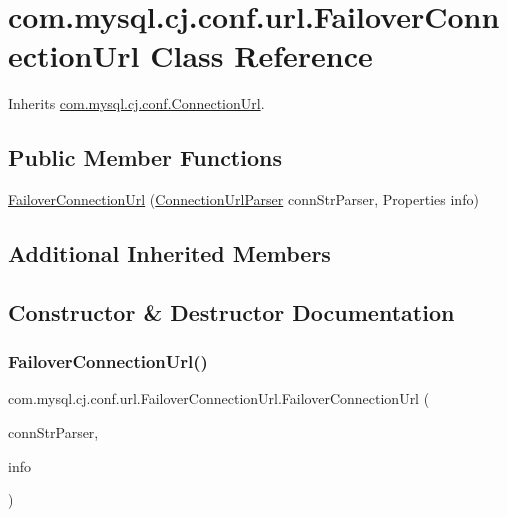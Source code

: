 \hypertarget{classcom_1_1mysql_1_1cj_1_1conf_1_1url_1_1_failover_connection_url}{}\section{com.\+mysql.\+cj.\+conf.\+url.\+Failover\+Connection\+Url Class Reference}
\label{classcom_1_1mysql_1_1cj_1_1conf_1_1url_1_1_failover_connection_url}


Inherits \mbox{\hyperlink{classcom_1_1mysql_1_1cj_1_1conf_1_1_connection_url}{com.\+mysql.\+cj.\+conf.\+Connection\+Url}}.

\subsection*{Public Member Functions}
\begin{DoxyCompactItemize}
\item 
\mbox{\hyperlink{classcom_1_1mysql_1_1cj_1_1conf_1_1url_1_1_failover_connection_url_a333794b536f65b34f5dd6f0f24683daa}{Failover\+Connection\+Url}} (\mbox{\hyperlink{classcom_1_1mysql_1_1cj_1_1conf_1_1_connection_url_parser}{Connection\+Url\+Parser}} conn\+Str\+Parser, Properties info)
\end{DoxyCompactItemize}
\subsection*{Additional Inherited Members}


\subsection{Constructor \& Destructor Documentation}
\mbox{\label{classcom_1_1mysql_1_1cj_1_1conf_1_1url_1_1_failover_connection_url_a333794b536f65b34f5dd6f0f24683daa}} 
\subsubsection{\texorpdfstring{Failover\+Connection\+Url()}{FailoverConnectionUrl()}}
{\footnotesize\ttfamily com.\+mysql.\+cj.\+conf.\+url.\+Failover\+Connection\+Url.\+Failover\+Connection\+Url (\begin{DoxyParamCaption}\item[{\mbox{\hyperlink{classcom_1_1mysql_1_1cj_1_1conf_1_1_connection_url_parser}{Connection\+Url\+Parser}}}]{conn\+Str\+Parser,  }\item[{Properties}]{info }\end{DoxyParamCaption})}

